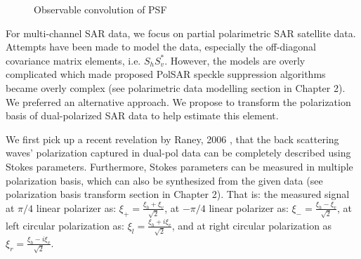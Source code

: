 \begin{figure}[h!]
\centering
	\hfill
\caption{Observable convolution of PSF}
\label{fig:noise_pdf_as_psf}
\end{figure}
  
For multi-channel SAR data, we focus on partial polarimetric SAR satellite data.
Attempts have been made to model the data, especially the off-diagonal covariance matrix elements, i.e. $S_hS_v^*$.
However, the models are overly complicated which made proposed PolSAR speckle suppression algorithms became overly complex (see polarimetric data modelling section in Chapter 2).
We preferred an alternative approach.
We propose to transform the polarization basis of dual-polarized SAR data to help estimate this element.

We first pick up a recent revelation by Raney, 2006 \cite{Raney_2006_IGARSS}, that the back scattering waves' polarization captured in dual-pol data can be completely described using Stokes parameters.
Furthermore, Stokes parameters can be measured in multiple polarization basis, which can also be synthesized from the given data (see polarization basis transform section in Chapter 2).
That is:
	the measured signal at $\pi/4$ linear polarizer as: $\xi_+ = \frac{\xi_h + \xi_v}{\sqrt{2}}$,
	at $-\pi/4$ linear polarizer as: $\xi_- = \frac{\xi_h - \xi_v}{\sqrt{2}}$, 
	at left circular polarization as: $\xi_l = \frac{\xi_h + i \xi_v}{\sqrt{2}}$, 
	and at right circular polarization as $\xi_r = \frac{\xi_h - i \xi_v}{\sqrt{2}}$.

